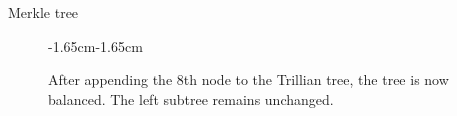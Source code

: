 \documentclass{practice}
\begin{document}
\begin{task}{Merkle tree}
\begin{itemize}
\begin{figure}[h!]
\begin{adjustwidth}{-1.65cm}{-1.65cm}
\begin{minipage}{0.6\textwidth}
    \caption{After appending the 8th node to the Trillian tree, the tree is now balanced.
    The left subtree remains unchanged.}
    \end{minipage}
    \end{adjustwidth}
    \end{figure}
  \end{itemize}
\end{task}
\end{document}
